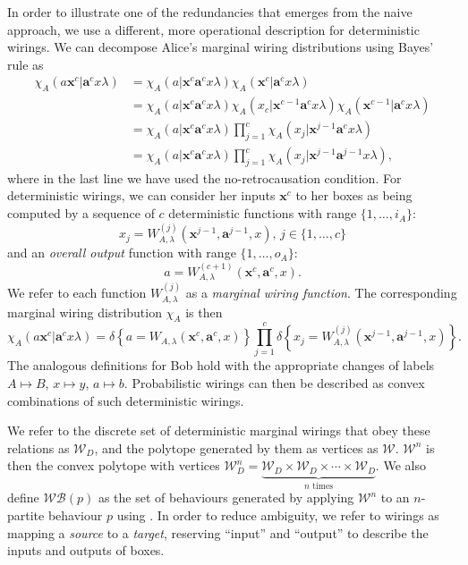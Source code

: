 \documentclass[10pt, a4paper]{article}
\numberwithin{equation}{section} %
\theoremstyle{definition}
\theoremstyle{plain}
\newcommand{\dintv}[2]{\mathopen\{#1,\ldots,#2\mathclose\}}
\newcommand{\?}{\mathrel{?}} %
\newcommand{\cvec}[1]{\boldsymbol{\mathbf{#1}}}    %
\newcommand{\indic}[1]{\delta{\left\{#1\right\}}} %
\newcommand{\sW}{\mathcal{W}}
\newcommand{\sWB}{\mathcal{WB}}
\begin{document}
      In order to illustrate one of the redundancies that emerges from the naive approach, we use a different, more operational description for deterministic wirings. We can decompose Alice's marginal wiring distributions using Bayes' rule as
      \begin{align}
        \chi_A(a\cvec{x}^c|\cvec{a}^cx\lambda) &= \chi_A(a|\cvec{x}^c\cvec{a}^cx\lambda) \chi_A(\cvec{x}^{c}|\cvec{a}^cx\lambda) \\
        &= \chi_A(a|\cvec{x}^c\cvec{a}^cx\lambda) \chi_A(x_c|\cvec{x}^{c-1}\cvec{a}^cx\lambda) \chi_A(\cvec{x}^{c-1}|\cvec{a}^cx\lambda) \\
        &= \chi_A(a|\cvec{x}^c\cvec{a}^cx\lambda) \prod_{j=1}^c \chi_A(x_j|\cvec{x}^{j-1}\cvec{a}^cx\lambda) \\
        &= \chi_A(a|\cvec{x}^c\cvec{a}^{c}x\lambda) \prod_{j=1}^c \chi_A(x_j|\cvec{x}^{j-1}\cvec{a}^{j-1}x\lambda),
      \end{align}
      where in the last line we have used the no-retrocausation condition. For deterministic wirings, we can consider her inputs \(\cvec{x}^c\) to her boxes as being computed by a sequence of \(c\) deterministic functions with range \(\dintv{1}{i_A}\):
      \begin{equation} x_j = W^{(j)}_{A,\lambda}(\cvec{x}^{j-1}, \cvec{a}^{j-1}, x),\,j \in \dintv{1}{c} \end{equation}
      and an \emph{overall output} function with range \(\dintv{1}{o_A}\):
      \begin{equation} a = W_{A,\lambda}^{(c+1)}(\cvec{x}^{c}, \cvec{a}^{c}, x). \end{equation}
      We refer to each function \(W_{A,\lambda}^{(j)}\) as a \emph{marginal wiring function}. The corresponding marginal wiring distribution \(\chi_A\) is then
      \begin{equation}
        \chi_A(a\cvec{x}^c|\cvec{a}^cx\lambda) = \indic{a = W_{A,\lambda}(\cvec{x}^{c}, \cvec{a}^{c}, x)} \prod_{j=1}^c \indic{x_j = W^{(j)}_{A,\lambda}(\cvec{x}^{j-1}, \cvec{a}^{j-1}, x)}.
      \end{equation}
      The analogous definitions for Bob hold with the appropriate changes of labels \(A \mapsto B\), \(x \mapsto y\), \(a \mapsto b\). Probabilistic wirings can then be described as convex combinations of such deterministic wirings.

      We refer to the discrete set of deterministic marginal wirings that obey these relations as \(\sW_D\), and the polytope generated by them as vertices as \(\sW\). \(\sW^n\) is then the convex polytope with vertices \(\sW_D^n = \underbrace{\sW_D \times \sW_D \times \cdots \times \sW_D}_{n\text{ times}}\). We also define \(\sWB(p)\) as the set of behaviours generated by applying \(\sW^n\) to an \(n\)-partite behaviour \(p\) using . In order to reduce ambiguity, we refer to wirings as mapping a \emph{source} to a \emph{target}, reserving ``input'' and ``output'' to describe the inputs and outputs of boxes.
\end{document}

